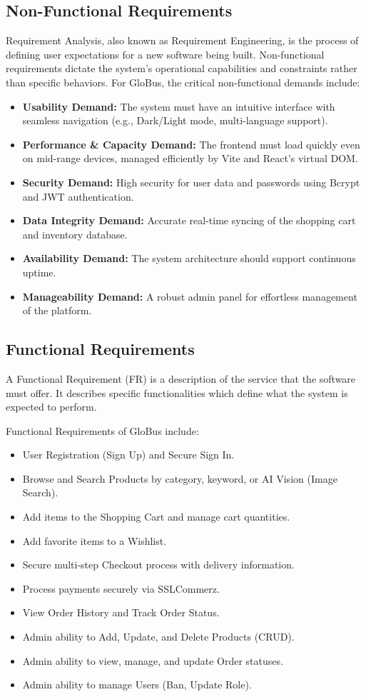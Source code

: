\subsection{Non-Functional Requirements}
Requirement Analysis, also known as Requirement Engineering, is the process of defining user expectations for a new software being built. Non-functional requirements dictate the system's operational capabilities and constraints rather than specific behaviors. For GloBus, the critical non-functional demands include:
\begin{itemize}
    \item \textbf{Usability Demand:} The system must have an intuitive interface with seamless navigation (e.g., Dark/Light mode, multi-language support).
    \item \textbf{Performance \& Capacity Demand:} The frontend must load quickly even on mid-range devices, managed efficiently by Vite and React's virtual DOM.
    \item \textbf{Security Demand:} High security for user data and passwords using Bcrypt and JWT authentication.
    \item \textbf{Data Integrity Demand:} Accurate real-time syncing of the shopping cart and inventory database.
    \item \textbf{Availability Demand:} The system architecture should support continuous uptime.
    \item \textbf{Manageability Demand:} A robust admin panel for effortless management of the platform.
\end{itemize}

\subsection{Functional Requirements}
A Functional Requirement (FR) is a description of the service that the software must offer. It describes specific functionalities which define what the system is expected to perform.

Functional Requirements of GloBus include:
\begin{itemize}
    \item User Registration (Sign Up) and Secure Sign In.
    \item Browse and Search Products by category, keyword, or AI Vision (Image Search).
    \item Add items to the Shopping Cart and manage cart quantities.
    \item Add favorite items to a Wishlist.
    \item Secure multi-step Checkout process with delivery information.
    \item Process payments securely via SSLCommerz.
    \item View Order History and Track Order Status.
    \item Admin ability to Add, Update, and Delete Products (CRUD).
    \item Admin ability to view, manage, and update Order statuses.
    \item Admin ability to manage Users (Ban, Update Role).
\end{itemize}

